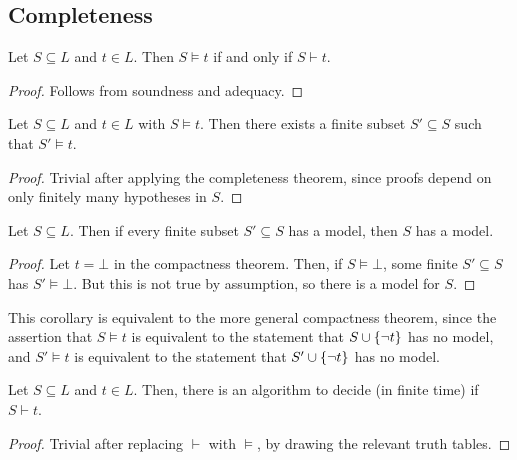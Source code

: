 \subsection{Completeness}
\begin{theorem}
    Let \( S \subseteq L \) and \( t \in L \).
    Then \( S \models t \) if and only if \( S \vdash t \).
\end{theorem}
\begin{proof}
    Follows from soundness and adequacy.
\end{proof}
\begin{theorem}
    Let \( S \subseteq L \) and \( t \in L \) with \( S \models t \).
    Then there exists a finite subset \( S' \subseteq S \) such that \( S' \models t \).
\end{theorem}
\begin{proof}
    Trivial after applying the completeness theorem, since proofs depend on only finitely many hypotheses in \( S \).
\end{proof}
\begin{corollary}
    Let \( S \subseteq L \).
    Then if every finite subset \( S' \subseteq S \) has a model, then \( S \) has a model.
\end{corollary}
\begin{proof}
    Let \( t = \bot \) in the compactness theorem.
    Then, if \( S \models \bot \), some finite \( S' \subseteq S \) has \( S' \models \bot \).
    But this is not true by assumption, so there is a model for \( S \).
\end{proof}
\begin{remark}
    This corollary is equivalent to the more general compactness theorem, since the assertion that \( S \models t \) is equivalent to the statement that \( S \cup \qty{\neg t} \) has no model, and \( S' \models t \) is equivalent to the statement that \( S' \cup \qty{\neg t} \) has no model.
\end{remark}
\begin{theorem}
    Let \( S \subseteq L \) and \( t \in L \).
    Then, there is an algorithm to decide (in finite time) if \( S \vdash t \).
\end{theorem}
\begin{proof}
    Trivial after replacing \( \vdash \) with \( \models \), by drawing the relevant truth tables. 
\end{proof}
